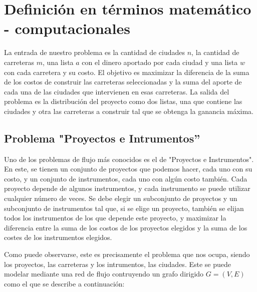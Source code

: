 \documentclass[10pt]{article} %
\begin{document}
	\section{Definici\'on en t\'erminos matem\'atico - computacionales}\label{section_2}
	
	La entrada de nuestro problema es la cantidad de ciudades $n$, la cantidad de carreteras $m$, una lista $a$ con el dinero aportado por cada ciudad y una lista $w$ con cada carretera y su costo. El objetivo es maximizar la diferencia de la suma de los costos de construir las carreteras seleccionadas y la suma del aporte de cada una de las ciudades que intervienen en esas carreteras. La salida del problema es la distribuci\'on del proyecto como dos listas, una que contiene las ciudades y otra las carreteras a construir tal que se obtenga la ganancia m\'axima.
	
	\subsection{Problema "Proyectos e Intrumentos''}
	
	Uno de los problemas de flujo más conocidos es el de "Proyectos e Instrumentos". En este, se tienen un conjunto de proyectos que podemos hacer, cada uno con su costo, y un conjunto de instrumentos, cada uno con algún costo tambi\'en. Cada proyecto depende de algunos instrumentos, y cada instrumento se puede utilizar cualquier número de veces. Se debe elegir un subconjunto de proyectos y un subconjunto de instrumentos tal que, si se elige un proyecto, también se elijan todos los instrumentos de los que depende este proyecto, y maximizar la diferencia entre la suma de los costos de los proyectos elegidos y la suma de los costes de los instrumentos elegidos.
	
	Como puede observarse, este es precisamente el problema que nos ocupa, siendo los proyectos, las carreteras y los intrumentos, las ciudades. Este se puede modelar mediante una red de flujo contruyendo un grafo dirigido $G = (V, E)$ como el que se describe a continuaci\'on:
	
\end{document}

